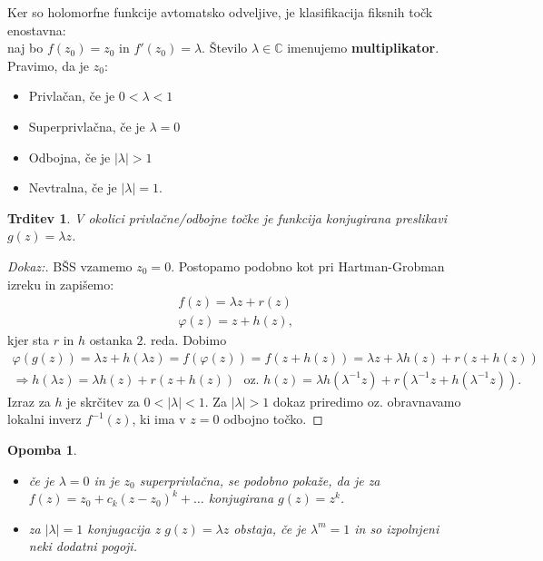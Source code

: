 \documentclass{article}
\newtheorem{trditev}{Trditev}
\newtheorem{opomba}{Opomba}
\newcommand{\C}{\mathbb{C}}
\begin{document}
Ker so holomorfne funkcije avtomatsko odveljive, je klasifikacija
fiksnih točk enostavna: \\
naj bo $f(z_0) = z_0$ in $f'(z_0) = \lambda$. Število $\lambda \in \C$
imenujemo \textbf{multiplikator}.
Pravimo, da je $z_0$:
\begin{itemize}
    \item Privlačan, če je $0 < \lambda < 1$
    \item Superprivlačna, če je $\lambda = 0$
    \item Odbojna, če je $|\lambda| > 1$ 
    \item Nevtralna, če je $|\lambda| = 1$.
\end{itemize}

\begin{trditev}
V okolici privlačne\slash odbojne točke je funkcija konjugirana 
preslikavi $g(z) = \lambda z$.
\end{trditev}

\begin{proof}[Dokaz:]
BŠS vzamemo $z_0 = 0$. Postopamo podobno kot pri Hartman-Grobman izreku in 
zapišemo:
\begin{align*}
f(z) = \lambda z + r(z) \\
\varphi(z) = z + h(z),
\end{align*}
kjer sta $r$ in $h$ ostanka $2$. reda. Dobimo 
\begin{align*}
\varphi(g(z)) = \lambda z + h(\lambda z) = f(\varphi(z)) = f(z + h(z)) = \lambda z + \lambda h(z) + r(z + h(z))\\
\Longrightarrow h(\lambda z) = \lambda h(z) + r(z + h(z)) \,\, \text{ oz. } h(z) = \lambda h(\lambda^{-1} z) + r(\lambda^{-1} z + h(\lambda^{-1} z)).
\end{align*}
Izraz za $h$ je skrčitev za $0 < |\lambda| < 1$. Za $|\lambda| > 1$ 
dokaz priredimo oz. obravnavamo lokalni inverz $f^{-1}(z)$, ki ima 
v $z = 0$ odbojno točko.
\end{proof}

\begin{opomba}
\hfill
\begin{itemize}
    \item če je $\lambda = 0$ in je $z_0$ superprivlačna, se podobno pokaže, 
    da je za $f(z) = z_0 + c_k(z - z_0)^k + \dots$ konjugirana $g(z) = z^k$.
    \item za $|\lambda| = 1$ konjugacija z $g(z) = \lambda z$ obstaja, če je 
    $\lambda^m = 1$ in so izpolnjeni neki dodatni pogoji.
\end{itemize}
\end{opomba}
\end{document}
